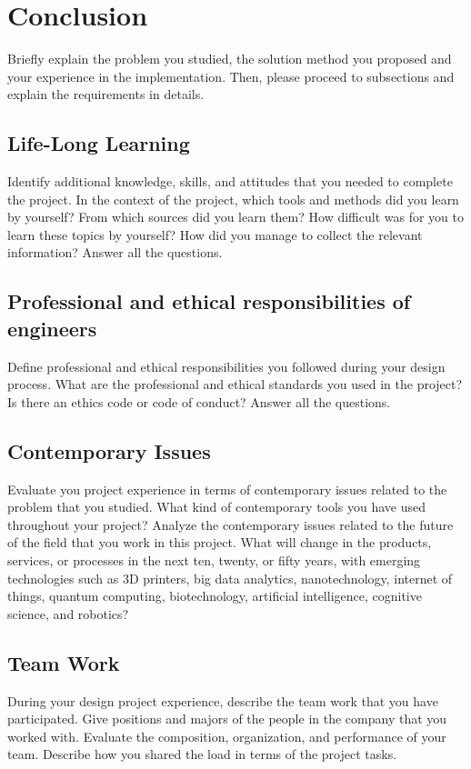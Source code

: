 \documentclass{mefsdp}
\begin{document}
	\section{Conclusion}
	Briefly explain the problem you studied, the solution method you proposed and your experience in the implementation. Then, please proceed to subsections and explain the requirements in details. 
	
	\subsection{Life-Long Learning}
	Identify additional knowledge, skills, and attitudes that you needed to complete the project. In the context of the project, which tools and methods did you learn by yourself?  From which sources did you learn them? How difficult was for you to learn these topics by yourself? How did you manage to collect the relevant information? Answer all the questions.
	
	\subsection{Professional and ethical responsibilities of engineers}
	Define professional and ethical responsibilities you followed during your design process. What are the professional and ethical standards you used in the project? Is there an ethics code or code of conduct? Answer all the questions.
	
	\subsection{Contemporary Issues}
	Evaluate you project experience in terms of contemporary issues related to the problem that you studied. What kind of contemporary tools you have used throughout your project? Analyze the contemporary issues related to the future of the field that you work in this project. What will change in the products, services, or processes in the next ten, twenty, or fifty years, with emerging technologies such as 3D printers, big data analytics, nanotechnology, internet of things, quantum computing, biotechnology, artificial intelligence, cognitive science, and robotics?
	
	\subsection{Team Work}
	During your design project experience, describe the team work that you have participated. Give positions and majors of the people in the company that you worked with. Evaluate the composition, organization, and performance of your team. Describe how you shared the load in terms of the project tasks. 
	
	
	
	
	
\end{document}
